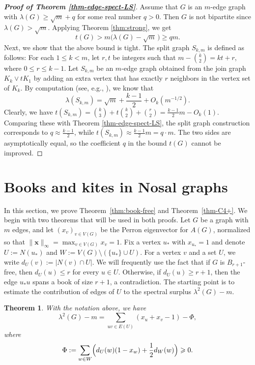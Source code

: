 \documentclass[10pt,a4paper]{amsart}
\newtheorem{theorem}{Theorem}[section]
\renewcommand{\le}{\leqslant}
\renewcommand{\ge}{\geqslant}
\begin{document}
\begin{proof}[{\bf Proof of Theorem \ref{thm-edge-spect-LS}}]
    Assume that $G$ is an $m$-edge graph with $\lambda (G)\ge \sqrt{m} +q$ for some real number $q>0$. Then $G$ is not bipartite since $\lambda (G)> \sqrt{m}$. 
    Applying Theorem \ref{thm:strong}, we get 
    $$ t (G)> m \big( \lambda (G)- \sqrt{m}\, \big)\ge qm. $$
    Next, we show that 
the above bound is tight. The split graph $S_{k,m}$ is defined as follows: For each $1\le k<m$, let $r,t$ be integers such that $m- {k \choose 2}= k t + r$, where $0\le r\le k-1$. 
Let $S_{k,m}$ be an $m$-edge graph 
obtained from the join graph $K_{k}\vee tK_1$ by adding an extra vertex that has exactly $r$ neighbors in the vertex set of $K_k$. By computation (see, e.g., \cite[Lemma 3.3]{LLLZ2026}), we know that 
$$ \lambda (S_{k,m})=\sqrt{m} + \frac{k-1}{2} + O_k(m^{-1/2}). $$
Clearly, we have  $t(S_{k,m})= {k \choose 3} + t {k \choose 2} + {r \choose 2} = \frac{k-1}{2}m-O_k(1)$.  
Comparing these with Theorem \ref{thm-edge-spect-LS}, the split graph  construction corresponds to $q\approx \frac{k-1}{2}$, while $t(S_{k,m})\approx \frac{k-1}{2}m = q\cdot m$. The two sides are asymptotically equal, 
so the coefficient $q$ in the bound $t(G)$ cannot be improved. 
\end{proof} 



\section{Books and kites in Nosal graphs}
\label{sec:4}

In this section, we prove Theorem~\ref{thm:book-free} and Theorem~\ref{thm-C4+}.
We begin with two theorems that will be used in both proofs. 
Let $G$ be a graph with $m$ edges, and let $(x_v)_{v\in V(G)}$ be the Perron eigenvector for $A(G)$, normalized so that $\| \bm{x}\|_{\infty} = \max_{v\in V(G)}x_v=1$. 
Fix a vertex $u_*$ with $x_{u_*}=1$ and denote $U:=N(u_*)$ and $W:=V(G)\setminus (\{u_*\}\cup U)$.  
For a vertex $v$ and a set $U$, we write $d_U(v):=|N(v)\cap U|$.   
We will frequently use the fact that if $G$ is $B_{r+1}$-free, then  $d_U(u)\le r$ for every $u\in U$. Otherwise, if $d_U(u)\ge r+1$, then the edge $u_*u$ spans a book of size $r+1$, a contradiction. 
The starting point is to estimate the contribution of edges of $U$ to the spectral surplus $\lambda^2(G)-m$.

\begin{theorem} \label{thm:identity}
With the notation above, we have 
\[
\lambda^2(G)-m=\sum_{uv\in E(U)}(x_u+x_v-1)-\Phi,
\]
where
\[
\Phi:=\sum_{w\in W}\Bigl(d_U(w)(1-x_w)+\frac12 d_W(w)\Bigr) \ge 0.
\]
\end{theorem}
\end{document}
